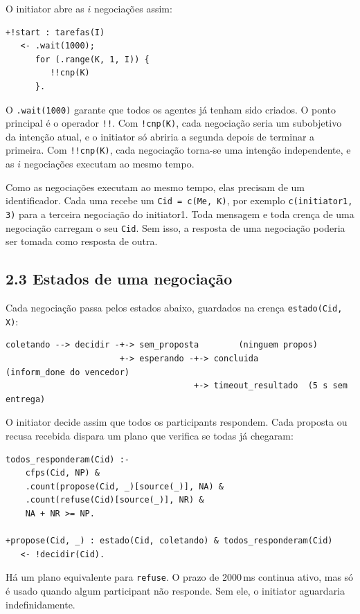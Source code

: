 \documentclass[11pt,a4paper]{article}
\newcommand{\cod}[1]{\texttt{#1}}
\begin{document}
O initiator abre as $i$ negociações assim:

\begin{lstlisting}
+!start : tarefas(I)
   <- .wait(1000);
      for (.range(K, 1, I)) {
         !!cnp(K)
      }.
\end{lstlisting}

O \cod{.wait(1000)} garante que todos os agentes já tenham sido criados. O ponto principal é o operador \cod{!!}. Com \cod{!cnp(K)}, cada negociação seria um subobjetivo da intenção atual, e o initiator só abriria a segunda depois de terminar a primeira. Com \cod{!!cnp(K)}, cada negociação torna-se uma intenção independente, e as $i$ negociações executam ao mesmo tempo.

Como as negociações executam ao mesmo tempo, elas precisam de um identificador. Cada uma recebe um \cod{Cid = c(Me, K)}, por exemplo \cod{c(initiator1, 3)} para a terceira negociação do initiator1. Toda mensagem e toda crença de uma negociação carregam o seu \cod{Cid}. Sem isso, a resposta de uma negociação poderia ser tomada como resposta de outra.

\subsection*{2.3 Estados de uma negociação}

Cada negociação passa pelos estados abaixo, guardados na crença \cod{estado(Cid, X)}:

\begin{lstlisting}
coletando --> decidir -+-> sem_proposta        (ninguem propos)
                       +-> esperando -+-> concluida          (inform_done do vencedor)
                                      +-> timeout_resultado  (5 s sem entrega)
\end{lstlisting}

O initiator decide assim que todos os participants respondem. Cada proposta ou recusa recebida dispara um plano que verifica se todas já chegaram:

\begin{lstlisting}
todos_responderam(Cid) :-
    cfps(Cid, NP) &
    .count(propose(Cid, _)[source(_)], NA) &
    .count(refuse(Cid)[source(_)], NR) &
    NA + NR >= NP.

+propose(Cid, _) : estado(Cid, coletando) & todos_responderam(Cid)
   <- !decidir(Cid).
\end{lstlisting}

Há um plano equivalente para \cod{refuse}. O prazo de 2000\,ms continua ativo, mas só é usado quando algum participant não responde. Sem ele, o initiator aguardaria indefinidamente.
\end{document}
